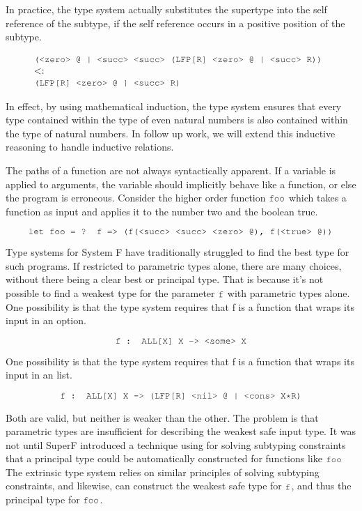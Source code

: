 \documentclass[acmsmall]{acmart}
\theoremstyle{definition}
\begin{document}
In practice, the type system actually substitutes the supertype into
the self reference of the subtype, if the self reference occurs in a positive position of the subtype.

\[
  \begin{array}[t]{@{} l}
    \J{(<zero> @ | <succ> <succ> (LFP[R] <zero> @ | <succ> R))} 
    \\
    \subtypes 
    \\
    \J{(LFP[R] <zero> @ | <succ> R)}
  \end{array}
\]


In effect, by using mathematical induction, the type system ensures that 
every type contained within the type of even natural numbers is also
contained within the type of natural numbers.
In follow up work, we will extend this inductive reasoning to handle inductive relations. 


The paths of a function are not always syntactically apparent. 
If a variable is applied to arguments, the variable should implicitly behave 
like a function, or else the program is erroneous. 
Consider the higher order function $\J{foo}$ which takes a function as input
and applies it to the number two and the boolean true.

\[
  \J{let foo = ? f => (f(<succ> <succ> <zero> @), f(<true> @))}
\]

Type systems for System F have traditionally struggled to find the best
type for such programs. If restricted to parametric types alone, there are many choices,
without there being a clear best or principal type. 
That is because it's not possible to find a weakest type for the parameter
$\J{f}$ with parametric types alone.
One possibility is that the type system requires that f is a function that wraps its
input in an option. 

\[
  \J{f : ALL[X] X -> <some> X}
\]

One possibility is that the type system requires that f is a function that wraps its
input in an list. 

\[
  \J{f : ALL[X] X -> (LFP[R] <nil> @ | <cons> X*R)}
\]

Both are valid, but neither is weaker than the other. The problem is that parametric
types are insufficient for describing the weakest safe input type.
It was not until SuperF introduced a technique using for solving subtyping constraints
that a principal type could be automatically constructed for functions like $\J{foo}$
The extrinsic type system relies on similar principles of solving subtyping constraints,
and likewise, can construct the weakest safe type for $\J{f}$, and thus the principal type for $\J{foo}$.
\end{document}
